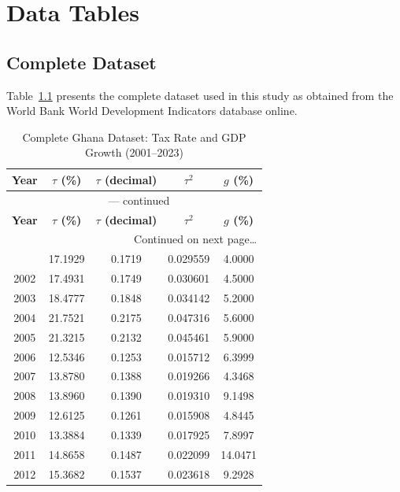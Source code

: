 \documentclass[12pt,a4paper]{report}
\theoremstyle{definition}
\theoremstyle{plain}
\theoremstyle{remark}
\begin{document}
	
	
	\chapter{Data Tables}
	\label{app:data}
	
	\section{Complete Dataset}
	
	Table~\ref{tab:app_raw_data} presents the complete
	dataset used in this study as obtained from the
	World Bank World Development Indicators database online.
	
	\begin{longtable}{ccccc}
		\caption{Complete Ghana Dataset: Tax Rate and
			GDP Growth (2001--2023)}
		\label{tab:app_raw_data} \\
		\toprule
		\textbf{Year} &
		\textbf{$\tau$ (\%)} &
		\textbf{$\tau$ (decimal)} &
		\textbf{$\tau^2$} &
		\textbf{$g$ (\%)} \\
		\midrule
		\endfirsthead
		\multicolumn{5}{c}{\tablename\
			\thetable{} --- continued} \\
		\toprule
		\textbf{Year} &
		\textbf{$\tau$ (\%)} &
		\textbf{$\tau$ (decimal)} &
		\textbf{$\tau^2$} &
		\textbf{$g$ (\%)} \\
		\midrule
		\endhead
		\midrule
		\multicolumn{5}{r}{Continued on next page\ldots}\\
		\endfoot
		\bottomrule
		\endlastfoot
		2001 & 17.1929 & 0.1719 & 0.029559 & 4.0000 \\
		2002 & 17.4931 & 0.1749 & 0.030601 & 4.5000 \\
		2003 & 18.4777 & 0.1848 & 0.034142 & 5.2000 \\
		2004 & 21.7521 & 0.2175 & 0.047316 & 5.6000 \\
		2005 & 21.3215 & 0.2132 & 0.045461 & 5.9000 \\
		2006 & 12.5346 & 0.1253 & 0.015712 & 6.3999 \\
		2007 & 13.8780 & 0.1388 & 0.019266 & 4.3468 \\
		2008 & 13.8960 & 0.1390 & 0.019310 & 9.1498 \\
		2009 & 12.6125 & 0.1261 & 0.015908 & 4.8445 \\
		2010 & 13.3884 & 0.1339 & 0.017925 & 7.8997 \\
		2011 & 14.8658 & 0.1487 & 0.022099 & 14.0471 \\
		2012 & 15.3682 & 0.1537 & 0.023618 & 9.2928 \\

\end{longtable}
\end{document}
